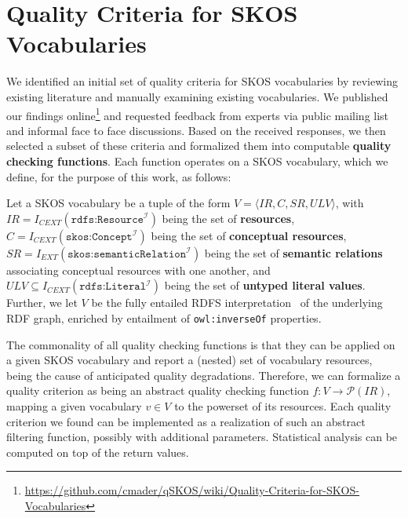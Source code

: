 
\section{Quality Criteria for SKOS Vocabularies}\label{sec:criteria}


We identified an initial set of quality criteria for SKOS vocabularies by reviewing existing literature and manually examining existing vocabularies. We published our findings online\footnote{\url{https://github.com/cmader/qSKOS/wiki/Quality-Criteria-for-SKOS-Vocabularies}} and requested feedback from experts via public mailing list and informal face to face discussions. Based on the received responses, we then selected a subset of these criteria and formalized them into computable \textbf{quality checking functions}. Each function operates on a SKOS vocabulary, which we define, for the purpose of this work, as follows:

\begin{definition} Let a SKOS vocabulary be a tuple of the form $V = \langle IR, C, SR, ULV \rangle$, with \(IR = I_{CEXT}(\texttt{rdfs:Resource}^\mathcal{I})\) being the set of \textbf{resources}, \(C = I_{CEXT}(\texttt{skos:Concept}^\mathcal{I})\) being the set of \textbf{conceptual resources}, \(SR = I_{EXT}(\texttt{skos:semanticRelation}^\mathcal{I})\) being the set of \textbf{semantic relations} associating conceptual resources with one another, and $ULV \subseteq I_{CEXT}(\texttt{rdfs:Literal}^\mathcal{I})$ being the set of \textbf{untyped literal values}. Further, we let $V$ be the fully entailed RDFS interpretation~\cite{RDFSEM2012} of the underlying RDF graph, enriched by entailment of \texttt{owl:inverseOf} properties. 

\end{definition}


The commonality of all quality checking functions is that they can be applied on a given SKOS vocabulary and report a (nested) set of vocabulary resources, being the cause of anticipated quality degradations. Therefore, we can formalize a quality criterion as being an abstract quality checking function $f:V \rightarrow \mathcal{P}(IR)$, mapping a given vocabulary $v \in V$ to the powerset of its resources. Each quality criterion we found can be implemented as a realization of such an abstract filtering function, possibly with additional parameters. Statistical analysis can be computed on top of the return values.

